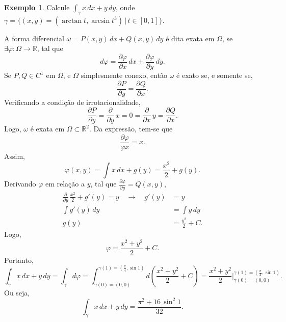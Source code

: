 \documentclass[11pt]{article}
\theoremstyle{definition}
\newtheorem{exemplo}{Exemplo}[subsection]
\begin{document}
	\begin{exemplo}
		Calcule $\int_{\gamma}x\,dx+y\,dy$, onde $\gamma=\{(x,y)=(\arctan t, \arcsin t^3)\,|\, t\in [0,1]\}$.
		
		A forma diferencial $\omega=P(x,y)\, dx+Q(x,y)\, dy$ é dita exata em $\Omega$, se $\exists\varphi:\Omega\to \mathbb{R}$, tal que
		\begin{equation*}
			d\varphi=\frac{\partial \varphi}{\partial x}\, dx+\frac{\partial \varphi}{\partial y}\, dy.
		\end{equation*}
		Se $P,Q\in C^1$ em $\Omega$, e $\Omega$ simplesmente conexo, então $\omega$ é exato se, e somente se,
		\begin{equation*}
			\frac{\partial P}{\partial y}=\frac{\partial Q}{\partial x}.
		\end{equation*}
		Verificando a condição de irrotacionalidade,
		\begin{equation*}
			\frac{\partial P}{\partial y}=\frac{\partial}{\partial y}\,x=0=\frac{\partial}{\partial x}\, y=\frac{\partial Q}{\partial x}.
		\end{equation*}
		Logo, $\omega$ é exata em $\Omega\subset \mathbb{R}^2$.
		Da expressão, tem-se que
		\begin{equation*}
			\frac{\partial \varphi}{\varphi x}=x.
		\end{equation*}
		Assim,
		\begin{equation*}
			\varphi(x,y)=\int x\,dx + g(y)=\frac{x^2}{2} + g(y).
		\end{equation*}
		Derivando $\varphi$ em relação a $y$, tal que $\frac{\partial \varphi}{\partial y}=Q(x,y)$,
		\begin{align*}
			\frac{\partial}{\partial y}\, \frac{x^2}{2}+g'(y)=y \quad\longrightarrow\quad g'(y)&=y\\
			\int g'(y)\, dy&=\int y\, dy\\
			g(y)&=\frac{y^2}{2}+C.
		\end{align*}
		Logo, 
		\begin{equation*}
			\varphi=\frac{x^2+y^2}{2}+C.
		\end{equation*}
		Portanto,
		\begin{equation*}
			\int_{\gamma}x\,dx+y\,dy=\int_{\gamma}d\varphi=\int_{\gamma(0)=(0,0)}^{\gamma(1)=\left(\frac{\pi}{4},\sin 1\right)}d\left(\frac{x^2+y^2}{2}+C\right)=\frac{x^2+y^2}{2}\Big|_{\gamma(0)=(0,0)}^{\gamma(1)=\left(\frac{\pi}{4},\sin 1\right)}.
		\end{equation*}
		Ou seja,
		\begin{equation*}
			\int_{\gamma}x\,dx+y\,dy=\frac{\pi^2+16\, \sin^2 1}{32}.
		\end{equation*}
	\end{exemplo}
	
\end{document}
